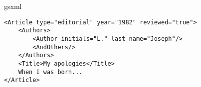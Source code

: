 %
%

\begin{NewFig}{gsxml}

\begin{lstlisting}[style=XML,basicstyle=\small\ttfamily]
<Article type="editorial" year="1982" reviewed="true">
	<Authors>
		<Author initials="L." last_name="Joseph"/>
		<AndOthers/>
	</Authors>
	<Title>My apologies</Title>
	When I was born...
</Article>
\end{lstlisting}

\caption[Internal  representation of an XML document]%
	{The internal  representation of the XML document
	underneath.  (Read left-to-right, top-to-bottom.)  Framed
	drawings symbolize objects of the corresponding class set at
	the top of the drawings.  Below that are the relevant fields
	of the objects.  Arrows denote \emph{has} relationship between
	objects.}
\end{NewFig}


